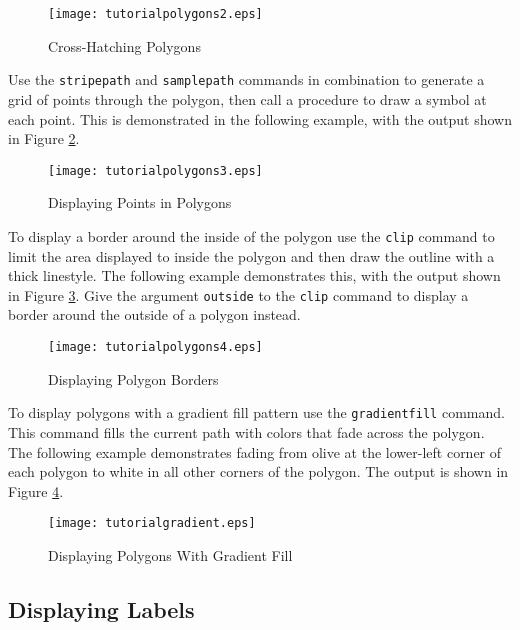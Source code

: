 

\begin{figure}[htb]
\texttt{[image: tutorialpolygons2.eps]}
\caption{Cross-Hatching Polygons}
\label{tutorialpolygons2}
\end{figure}

Use the \texttt{stripepath} and \texttt{samplepath}
commands in combination to generate a grid of points through the
polygon, then call a procedure to draw a symbol at each point.
This is demonstrated in the following example, with the output
shown in Figure \ref{tutorialpolygons3}.



\begin{figure}[htb]
\texttt{[image: tutorialpolygons3.eps]}
\caption{Displaying Points in Polygons}
\label{tutorialpolygons3}
\end{figure}

To display a border around the inside of the polygon
use the \texttt{clip}
command to limit the area displayed to inside the polygon
and then draw the outline with a thick linestyle.
The following example demonstrates this, with the output shown
in Figure \ref{tutorialpolygons4}.
Give the argument \texttt{outside}
to the \texttt{clip} command
to display a border around the outside of a polygon instead.



\begin{figure}[htb]
\texttt{[image: tutorialpolygons4.eps]}
\caption{Displaying Polygon Borders}
\label{tutorialpolygons4}
\end{figure}

To display polygons with a gradient fill pattern use
the \texttt{gradientfill} command.
This command fills the current path with colors that fade
across the polygon.
The following example demonstrates fading from olive at the
lower-left corner of each polygon to white in all other corners
of the polygon.  The output is shown in Figure \ref{tutorialgradient}.



\begin{figure}[htb]
\texttt{[image: tutorialgradient.eps]}
\caption{Displaying Polygons With Gradient Fill}
\label{tutorialgradient}
\end{figure}

\subsection{Displaying Labels}

